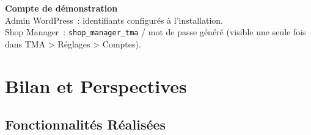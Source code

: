 \documentclass[12pt,a4paper]{report}
\begin{document}
\begin{infobox}
\textbf{Compte de d\'emonstration} \\
Admin WordPress~: identifiants configurés \`a l'installation.\\
Shop Manager~: \texttt{shop\_manager\_tma} / mot de passe g\'en\'er\'e
(visible une seule fois dans TMA > R\'eglages > Comptes).
\end{infobox}

\chapter{Bilan et Perspectives}

\section{Fonctionnalit\'es R\'ealis\'ees}
\end{document}
